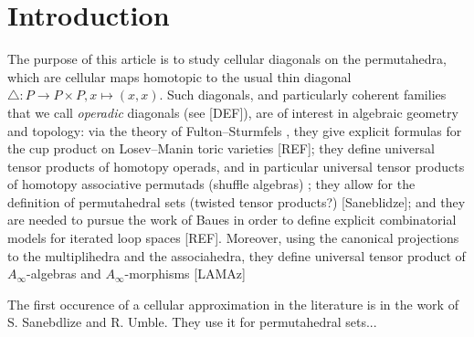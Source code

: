 
\section*{Introduction} 
\label{s:introduction}

The purpose of this article is to study cellular diagonals on the permutahedra, which are cellular maps homotopic to the usual thin diagonal $\triangle : P \to P \times P, x \mapsto (x,x)$.
Such diagonals, and particularly coherent families that we call \emph{operadic} diagonals (see [DEF]), are of interest in algebraic geometry and topology: via the theory of Fulton--Sturmfels \cite{fultonIntersectionTheoryToric1997a}, they give explicit formulas for the cup product on Losev--Manin toric varieties [REF]; they define universal tensor products of homotopy operads, and in particular universal tensor products of homotopy associative permutads (shuffle algebras) \cite{LA21}; they allow for the definition of permutahedral sets (twisted tensor products?) [Saneblidze]; and they are needed to pursue the work of Baues in order to define explicit combinatorial models for iterated loop spaces [REF]. 
Moreover, using the canonical projections to the multiplihedra and the associahedra, they define universal tensor product of $A_\infty$-algebras and $A_\infty$-morphisms [LAMAz]

The first occurence of a cellular approximation in the literature is in the work of S. Sanebdlize and R. Umble. 
They use it for permutahedral sets...







